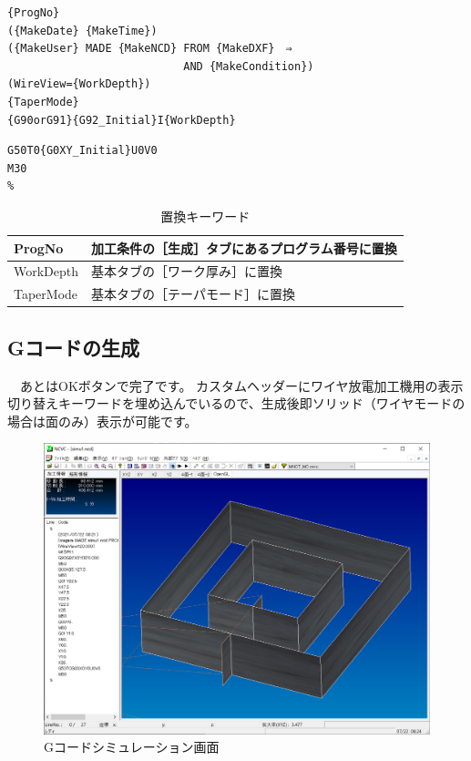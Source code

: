 \begin{minipage}[t]{0.6\textwidth}
\begin{lstlisting}[caption=Header.txt,numbers=none,label=lst:header.txt]
%
{ProgNo}
({MakeDate} {MakeTime})
({MakeUser} MADE {MakeNCD} FROM {MakeDXF}　⇒
                           AND {MakeCondition})
(WireView={WorkDepth})
{TaperMode}
{G90orG91}{G92_Initial}I{WorkDepth}
\end{lstlisting}
\end{minipage}
\begin{minipage}[t]{0.4\textwidth}
\begin{lstlisting}[caption=Footer.txt,numbers=none,label=lst:footer.txt]
G50T0{G0XY_Initial}U0V0
M30
%
\end{lstlisting}
\end{minipage}

\begin{table}[H]
\centering
\caption{置換キーワード}
\label{tab:keyword}
\begin{tabular}{|p{3cm}|p{10cm}|}
\hline
ProgNo & 加工条件の［生成］タブにあるプログラム番号に置換 \\ \hline
WorkDepth & 基本タブの［ワーク厚み］に置換 \\
TaperMode & 基本タブの［テーパモード］に置換 \\ \hline
\end{tabular}
\end{table}

\newpage %
\subsection{Gコードの生成}
　あとはOKボタンで完了です。
カスタムヘッダーにワイヤ放電加工機用の表示切り替えキーワードを埋め込んでいるので、生成後即ソリッド（ワイヤモードの場合は面のみ）表示が可能です。

\begin{figure}[H]
\centering
\includegraphics[scale=0.5]{No1/fig/simu1.png}
\caption{Gコードシミュレーション画面}
\label{fig:simu1.png}
\end{figure}

